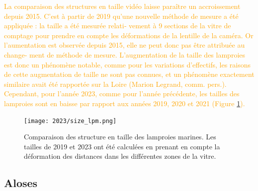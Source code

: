 \documentclass[11pt,twocolumn,titlepage,twoside]{article}\usepackage[]{graphicx}\usepackage[]{color}
\newcommand{\rev}[2][orange]{\textcolor{#1}{#2}}
\begin{document}
\rev{La comparaison des structures en taille vidéo laisse
paraître un accroissement depuis 2015. C’est à partir de 2019 qu’une nouvelle méthode de
mesure a été appliquée : la taille a été mesurée relati‐
vement à 9 sections de la vitre de comptage pour
prendre en compte les déformations de la lentille
de la caméra. Or l’aumentation est observée depuis
2015, elle ne peut donc pas être attribuée au change‐
ment de méthode de mesure. L’augmentation de la
taille des lamproies est donc un phénomène notable,
comme pour les variations d’effectifs, les raisons de
cette augmentation de taille ne sont pas connues, et un phénomène exactement
similaire avait été rapportée sur la Loire (Marion Legrand, comm. pers.).
Cependant, pour l'année 2023, comme pour l'année précédente, les tailles des
lamproies sont en baisse par rapport aux années 2019, 2020 et 2021 (Figure \ref{size_lpm}).}

\begin{figure}[htpb]
\centering
\texttt{[image: 2023/size\_lpm.png]} 
\caption{Comparaison des structure en taille des lamproies marines. Les tailles
de 2019 et 2023 ont été calculées en prenant en compte la déformation des distances dans les
différentes zones de la vitre.}
\label{size_lpm}
\end{figure}












\clearpage
\subsection{Aloses}
\end{document}
